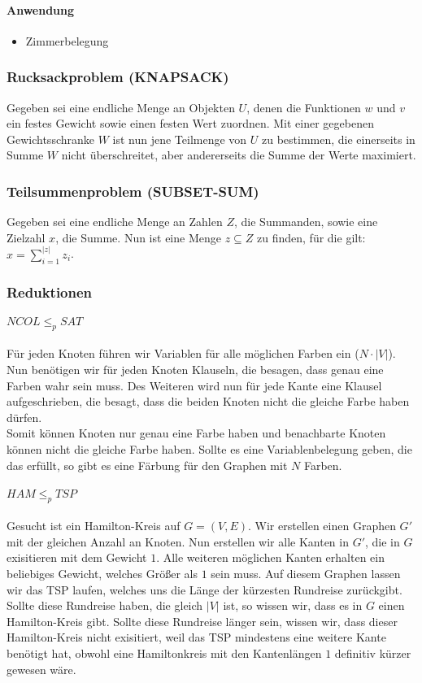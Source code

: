 \documentclass{article}
\begin{document}
\paragraph*{Anwendung}
\begin{itemize}
    \item Zimmerbelegung
\end{itemize}
\subsubsection{Rucksackproblem (KNAPSACK)}
Gegeben sei eine endliche Menge an Objekten $U$, denen die Funktionen $w$ und $v$ ein festes Gewicht sowie einen festen Wert zuordnen. Mit einer gegebenen Gewichtsschranke $W$ ist nun jene Teilmenge von $U$ zu bestimmen, die einerseits in Summe $W$ nicht überschreitet, aber andererseits die Summe der Werte maximiert.
\subsubsection{Teilsummenproblem (SUBSET-SUM)}
Gegeben sei eine endliche Menge an Zahlen $Z$, die Summanden, sowie eine Zielzahl $x$, die Summe. Nun ist eine Menge $z \subseteq Z$ zu finden, für die gilt: $x=\sum^{|z|}_{i=1} z_i$. 
\subsubsection{Reduktionen}
\paragraph{$NCOL \leq_p SAT$}
Für jeden Knoten führen wir Variablen für alle möglichen Farben ein ($N \cdot |V|$). Nun benötigen wir für jeden Knoten Klauseln, die besagen, dass genau eine Farben wahr sein muss. Des Weiteren wird nun für jede Kante eine Klausel aufgeschrieben, die besagt, dass die beiden Knoten nicht die gleiche Farbe haben dürfen. \\
\indent Somit können Knoten nur genau eine Farbe haben und benachbarte Knoten können nicht die gleiche Farbe haben. Sollte es eine Variablenbelegung geben, die das erfüllt, so gibt es eine Färbung für den Graphen mit $N$ Farben.
\paragraph{$HAM \leq_p TSP$}
Gesucht ist ein Hamilton-Kreis auf $G=(V,E)$. Wir erstellen einen Graphen $G'$ mit der gleichen Anzahl an Knoten. Nun erstellen wir alle Kanten in $G'$, die in $G$ exisitieren mit dem Gewicht $1$. Alle weiteren möglichen Kanten erhalten ein beliebiges Gewicht, welches Größer als $1$ sein muss. Auf diesem Graphen lassen wir das TSP laufen, welches uns die Länge der kürzesten Rundreise zurückgibt. \\
\indent Sollte diese Rundreise haben, die gleich $|V|$ ist, so wissen wir, dass es in $G$ einen Hamilton-Kreis gibt. Sollte diese Rundreise länger sein, wissen wir, dass dieser Hamilton-Kreis nicht exisitiert, weil das TSP mindestens eine weitere Kante benötigt hat, obwohl eine Hamiltonkreis mit den Kantenlängen $1$ definitiv kürzer gewesen wäre.
\end{document}
